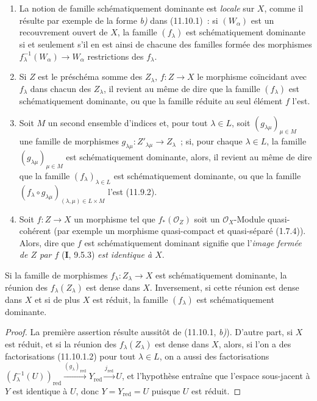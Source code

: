 \begin{remarks}[11.10.3]
\label{IV.11.10.3-fr}
\begin{enumerate}[label=(\roman*)]
  \item La notion de famille schématiquement dominante est \emph{locale} sur
  $X$, comme il résulte par exemple de la forme \emph{b)} dans (11.10.1)~: si
  $(W_\alpha)$ est un recouvrement ouvert de $X$, la famille $(f_\lambda)$ est
  schématiquement dominante si et seulement s'il en est ainsi de chacune des
  familles formée des morphismes
  $f_\lambda^{-1}(W_\alpha)\to W_\alpha$ restrictions des $f_\lambda$.
  \item Si $Z$ est le préschéma somme des $Z_\lambda$, $f:Z\to X$ le morphisme
  coïncidant avec $f_\lambda$ dans chacun des $Z_\lambda$, il revient au même
  de dire que la famille $(f_\lambda)$ est schématiquement dominante, ou que
  la famille réduite au seul élément $f$ l'est.
  \item Soit $M$ un second ensemble d'indices et, pour tout $\lambda\in L$,
  soit $(g_{\lambda\mu})_{\mu\in M}$ une famille de morphismes
  $g_{\lambda\mu}:Z'_{\lambda\mu}\to Z_\lambda$~; si, pour chaque
  $\lambda\in L$, la famille $(g_{\lambda\mu})_{\mu\in M}$ est
  schématiquement dominante, alors, il revient au même de dire que la famille
  $(f_\lambda)_{\lambda\in L}$ est schématiquement dominante, ou que la
  famille
  $(f_\lambda\circ g_{\lambda\mu})_{(\lambda,\mu)\in L\times M}$ l'est
  (11.9.2).
  \item Soit $f:Z\to X$ un morphisme tel que $f_*(\mathcal O_Z)$ soit un
  $\mathcal O_X$-Module quasi-cohérent (par exemple un morphisme quasi-compact
  et quasi-séparé (1.7.4)). Alors, dire que $f$ est schématiquement dominant
  signifie que l'\emph{image fermée de $Z$ par $f$} ($\mathbf I$, 9.5.3) \emph{est
  identique à $X$}.
\end{enumerate}
\end{remarks}

\begin{proposition}[11.10.4]
\label{IV.11.10.4-fr}
Si la famille de morphismes $f_\lambda:Z_\lambda\to X$ est schématiquement
dominante, la réunion des $f_\lambda(Z_\lambda)$ est dense dans $X$.
Inversement, si cette réunion est dense dans $X$ et si de plus $X$ est \textup{réduit},
la famille $(f_\lambda)$ est schématiquement dominante.
\end{proposition}

\begin{proof}
La première assertion résulte aussitôt de (11.10.1, \emph{b)}). D'autre part, si $X$
est réduit, et si la réunion des $f_\lambda(Z_\lambda)$ est dense dans $X$,
alors, si l'on a des factorisations (11.10.1.2) pour tout $\lambda\in L$, on a
aussi des factorisations
$(f_\lambda^{-1}(U))_{\mathrm{red}}
\xrightarrow{(g_\lambda)_{\mathrm{red}}}Y_{\mathrm{red}}
\xrightarrow{j_{\mathrm{red}}}U$,
et l'hypothèse entraîne que l'espace sous-jacent à $Y$ est identique à $U$,
donc $Y=Y_{\mathrm{red}}=U$ puisque $U$ est réduit.
\end{proof}

